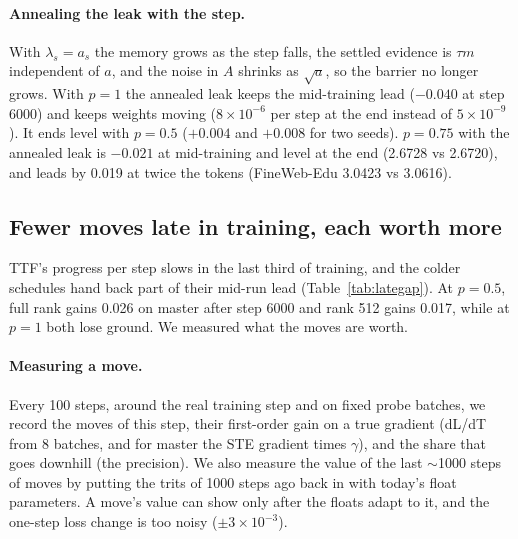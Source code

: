 \documentclass[10pt,twocolumn]{article}
\begin{document}
\paragraph{Annealing the leak with the step.} With $\lambda_s=a_s$ the memory grows as the step falls, the settled
evidence is $\tau m$ independent of $a$, and the noise in $A$ shrinks as $\sqrt a$, so the barrier no longer grows. With
$p=1$ the annealed leak keeps the mid-training lead ($-0.040$ at step 6000) and keeps weights moving
($8\times10^{-6}$ per step at the end instead of $5\times10^{-9}$). It ends level with $p=0.5$ ($+0.004$ and $+0.008$ for
two seeds). $p=0.75$ with the annealed leak is $-0.021$ at mid-training and level at the end (2.6728 vs 2.6720), and leads by
0.019 at twice the tokens (FineWeb-Edu 3.0423 vs 3.0616).

\subsection{Fewer moves late in training, each worth more}\label{sec:late}
TTF's progress per step slows in the last third of training, and the colder schedules hand back part of their mid-run
lead (Table~\ref{tab:lategap}). At $p=0.5$, full rank gains 0.026 on master after step 6000 and rank 512 gains 0.017,
while at $p=1$ both lose ground. We measured what the moves are worth.

\begin{table}[t]
\caption{TTF minus master at step 6000 and at the end (110M, training-time).}
\label{tab:lategap}
\end{table}

\paragraph{Measuring a move.} Every 100 steps, around the real training step and on fixed probe batches, we record the
moves of this step, their first-order gain on a true gradient (dL/dT from 8 batches, and for master the STE gradient times
$\gamma$), and the share that goes downhill (the precision). We also measure the value of the last $\sim$1000 steps of
moves by putting the trits of 1000 steps ago back in with today's float parameters. A move's value can show only after
the floats adapt to it, and the one-step loss change is too noisy ($\pm3\times10^{-3}$).
\end{document}
